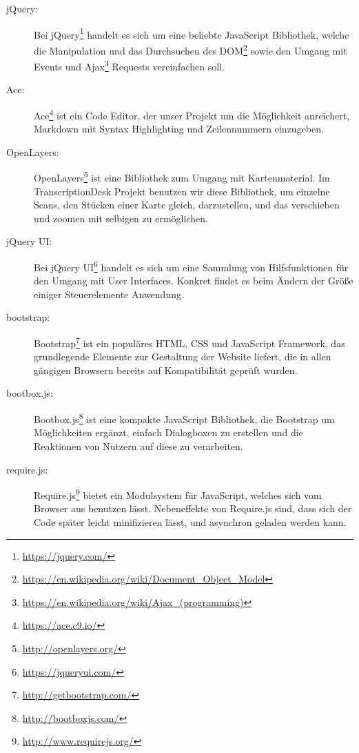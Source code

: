 \documentclass{article}
\begin{document}
\begin{description}
\item[jQuery:]
    Bei jQuery\footnote{\url{https://jquery.com/}} handelt es sich um eine beliebte JavaScript Bibliothek,
    welche die Manipulation und das Durchsuchen des DOM\footnote{\url{https://en.wikipedia.org/wiki/Document_Object_Model}} sowie
    den Umgang mit Events und Ajax\footnote{\url{https://en.wikipedia.org/wiki/Ajax_(programming)}} Requests vereinfachen soll.
\item[Ace:]
    Ace\footnote{\url{https://ace.c9.io/}} ist ein Code Editor, der unser Projekt um die Möglichkeit anreichert,
    Markdown mit Syntax Highlighting und Zeilennummern einzugeben.
\item[OpenLayers:]
    OpenLayers\footnote{\url{http://openlayers.org/}} ist eine Bibliothek zum Umgang mit Kartenmaterial.
    Im TranscriptionDesk Projekt benutzen wir diese Bibliothek,
    um einzelne Scans, den Stücken einer Karte gleich, darzustellen,
    und das verschieben und zoomen mit selbigen zu ermöglichen.
\item[jQuery UI:]
    Bei jQuery UI\footnote{\url{https://jqueryui.com/}} handelt es sich um eine Sammlung von Hilfsfunktionen für den Umgang mit User Interfaces.
    Konkret findet es beim Ändern der Größe einiger Steuerelemente Anwendung.
\item[bootstrap:]
    Bootstrap\footnote{\url{http://getbootstrap.com/}} ist ein populäres HTML, CSS und JavaScript Framework,
    das grundlegende Elemente zur Gestaltung der Website liefert, die in allen gängigen Browsern bereits auf Kompatibilität geprüft wurden.
\item[bootbox.js:]
    Bootbox.js\footnote{\url{http://bootboxjs.com/}} ist eine kompakte JavaScript Bibliothek,
    die Bootstrap um Möglichkeiten ergänzt,
    einfach Dialogboxen zu erstellen und die Reaktionen von Nutzern auf diese zu verarbeiten.
\item[require.js:]
    Require.js\footnote{\url{http://www.requirejs.org/}} bietet ein Modulsystem für JavaScript,
    welches sich vom Browser aus benutzen lässt.
    Nebeneffekte von Require.js sind, dass sich der Code später leicht minifizieren lässt,
    und asynchron geladen werden kann.
\end{description}
\end{document}
